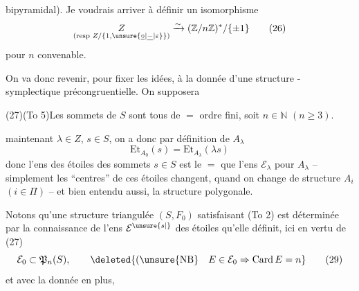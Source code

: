
bipyramidal). Je voudrais  arriver à définir un isomorphisme
\[
\underset{(\text{resp }Z/\{1,\unsure{\underline{\circ}|\underline{-}|\varepsilon}\})}{Z}\xrightarrow{\sim}(\mathbb Z/n\mathbb Z)^{*}/\{\pm1\}\tag*{(26)}
\]
pour $n$ convenable.

On va donc revenir, pour fixer les idées, à la donnée d'une structure -symplectique précongruentielle. On supposera

(27)\qquad (To 5)\qquad Les sommets de $S$ sont tous de $=$ ordre fini, soit $n\in\mathbb N$ $(n\geqslant3)$.

 maintenant $\lambda\in Z$, $s\in S$, on a donc par définition de $A_\lambda$
\[
\mathrm{Et}_{A_0}(s)=\mathrm{Et}_{A_\lambda}(\lambda s)\tag*{(28)}
\]
donc l'ens  des étoiles des  sommets $s\in S$ est le $=$ que l'ens $\mathcal E_\lambda$ pour $A_\lambda$ -- simplement les ``centres'' de ces étoiles changent, quand on change de structure $A_i$ $(i\in\Pi)$ -- et bien entendu aussi, la structure polygonale.

Notons qu'une structure triangulée $(S,F_0)$ satisfaisant  (To 2) est déterminée par la connaissance de l'ens $\mathcal E^{\unsure{s|{}}}$ des étoiles qu'elle définit, ici en vertu de (27)
\[
\mathcal E_0\subset\mathfrak P_n(S),\qquad \deleted{(\unsure{\mathrm{NB}}\quad E\in\mathcal E_0\Rightarrow\mathrm{Card}\,E=n}\tag*{(29)}
\]
et avec la donnée en plus,  

